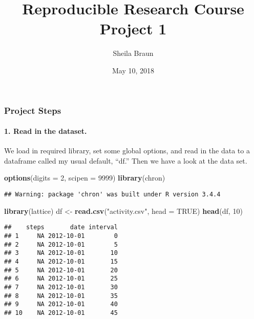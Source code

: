 \documentclass[]{article}
\title{Reproducible Research Course Project 1}
\author{Sheila Braun}
\date{May 10, 2018}
\newenvironment{Shaded}{\begin{snugshade}}{\end{snugshade}}
\newcommand{\KeywordTok}[1]{\textcolor[rgb]{0.13,0.29,0.53}{\textbf{#1}}}
\newcommand{\DataTypeTok}[1]{\textcolor[rgb]{0.13,0.29,0.53}{#1}}
\newcommand{\DecValTok}[1]{\textcolor[rgb]{0.00,0.00,0.81}{#1}}
\newcommand{\StringTok}[1]{\textcolor[rgb]{0.31,0.60,0.02}{#1}}
\newcommand{\OtherTok}[1]{\textcolor[rgb]{0.56,0.35,0.01}{#1}}
\newcommand{\NormalTok}[1]{#1}
\let\oldparagraph\paragraph
\renewcommand{\paragraph}[1]{\oldparagraph{#1}\mbox{}}
\begin{document}
\maketitle

\subsubsection{Project Steps}\label{project-steps}

\paragraph{1. Read in the dataset.}\label{read-in-the-dataset.}

We load in required library, set some global options, and read in the
data to a dataframe called my usual default, ``df.'' Then we have a look
at the data set.

\begin{Shaded}
\begin{Highlighting}[]
\KeywordTok{options}\NormalTok{(}\DataTypeTok{digits =} \DecValTok{2}\NormalTok{, }\DataTypeTok{scipen =} \DecValTok{9999}\NormalTok{)}
\KeywordTok{library}\NormalTok{(chron)}
\end{Highlighting}
\end{Shaded}

\begin{verbatim}
## Warning: package 'chron' was built under R version 3.4.4
\end{verbatim}

\begin{Shaded}
\begin{Highlighting}[]
\KeywordTok{library}\NormalTok{(lattice)}
\NormalTok{df <-}\StringTok{ }\KeywordTok{read.csv}\NormalTok{(}\StringTok{"activity.csv"}\NormalTok{, }\DataTypeTok{head =} \OtherTok{TRUE}\NormalTok{)}
\KeywordTok{head}\NormalTok{(df, }\DecValTok{10}\NormalTok{)}
\end{Highlighting}
\end{Shaded}

\begin{verbatim}
##    steps       date interval
## 1     NA 2012-10-01        0
## 2     NA 2012-10-01        5
## 3     NA 2012-10-01       10
## 4     NA 2012-10-01       15
## 5     NA 2012-10-01       20
## 6     NA 2012-10-01       25
## 7     NA 2012-10-01       30
## 8     NA 2012-10-01       35
## 9     NA 2012-10-01       40
## 10    NA 2012-10-01       45
\end{verbatim}
\end{document}
